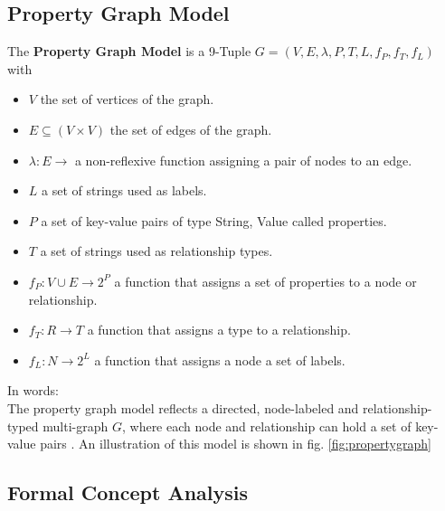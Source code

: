 \subsection{Property Graph Model}\label{\positionnumber}
The \textbf{Property Graph Model} is a 9-Tuple $G = (V, E, \lambda, P, T, L, f_P, f_T, f_L)$ with 
\begin{itemize}
    \item $V$ the set of vertices of the graph.
    \item $E \subseteq (V \times V)$ the set of edges of the graph.
    \item $\lambda: E \rightarrow $ a non-reflexive
 function assigning a pair of nodes to an edge.
    \item $L$ a set of strings used as labels.
    \item $P$ a set of key-value pairs of type String, Value called properties.
    \item $T$ a set of strings used as relationship types.
    \item $f_P: V \cup E \rightarrow 2^P$ a function that assigns a set of properties to a node or relationship.
   \item $f_T: R \rightarrow T$ a function that assigns a type to  a relationship.
   \item  $f_L: N \rightarrow 2^L$ a function that assigns a node a set of labels.
\end{itemize} 
\smallskip
In words: \\
The property graph model reflects a directed, node-labeled and relationship-typed multi-graph $G$, where each node and relationship can hold a set of key-value pairs \cite{angles2018property}. An illustration of this model is shown in fig. \ref{fig:propertygraph}



\subsection{Formal Concept Analysis}\label{\positionnumber}
 
